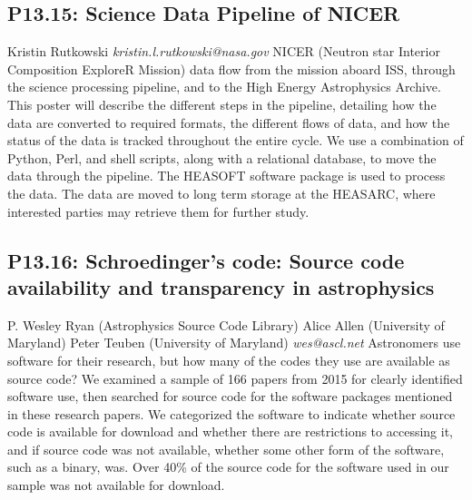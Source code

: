 \documentclass{report}
\begin{document}
\subsection*{P13.15: Science Data Pipeline of NICER}
\bigskip
Kristin Rutkowski  \newline   \newline   \newline   \newline  \newline  \newline\newline
{\it kristin.l.rutkowski@nasa.gov}\newline
\newline\newline
NICER (Neutron star Interior Composition ExploreR Mission) data flow from the mission aboard ISS, through the science processing pipeline, and to the High Energy Astrophysics Archive.  This poster will describe the different steps in the pipeline, detailing how the data are converted to required formats, the different flows of data, and how the status of the data is tracked throughout the entire cycle.  We use a combination of Python, Perl, and shell scripts, along with a relational database, to move the data through the pipeline.  The HEASOFT software package is used to process the data.  The data are moved to long term storage at the HEASARC, where interested parties may retrieve them for further study.\newline
\newpage
\subsection*{P13.16: Schroedinger’s code: Source code availability and transparency in astrophysics}
\bigskip
P. Wesley Ryan (Astrophysics Source Code Library) \newline Alice Allen (University of Maryland) \newline  Peter Teuben (University of Maryland)\newline   \newline  \newline  \newline\newline
{\it wes@ascl.net}\newline
\newline\newline
Astronomers use software for their research, but how many of the codes they use are available as source code? We examined a sample of 166 papers from 2015 for clearly identified software use, then searched for source code for the software packages mentioned in these research papers. We categorized the software to indicate whether source code is available for download and whether there are restrictions to accessing it, and if source code was not available, whether some other form of the software, such as a binary, was. Over 40\% of the source code for the software used in our sample was not available for download.
\end{document}
